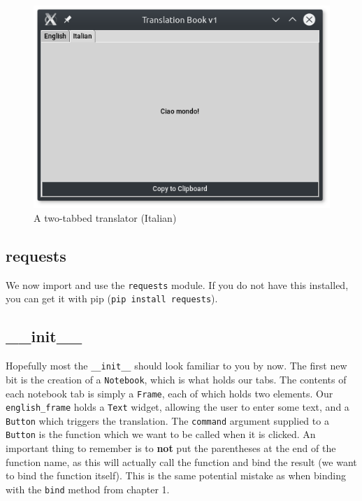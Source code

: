 \documentclass[a4paper,11pt,openany]{book}
\begin{document}
\newpage

\begin{figure}[h]
\centering
\includegraphics{Ch3-1-2}
\caption{A two-tabbed translator (Italian)}
\end{figure}



\subsection{requests}

We now import and use the \lstinline[columns=fixed]{requests} module. If you do not have this installed, you can get it with pip (\lstinline[columns=fixed]{pip install requests}).

\subsection{\_\_init\_\_}

Hopefully most the \lstinline[columns=fixed]{__init__} should look familiar to you by now. The first new bit is the creation of a \lstinline[columns=fixed]{Notebook}, which is what holds our tabs. The contents of each notebook tab is simply a \lstinline[columns=fixed]{Frame}, each of which holds two elements. Our \lstinline[columns=fixed]{english_frame} holds a \lstinline[columns=fixed]{Text} widget, allowing the user to enter some text, and a \lstinline[columns=fixed]{Button} which triggers the translation. The \lstinline[columns=fixed]{command} argument supplied to a \lstinline[columns=fixed]{Button} is the function which we want to be called when it is clicked. An important thing to remember is to \textbf{not} put the parentheses at the end of the function name, as this will actually call the function and bind the result (we want to bind the function itself). This is the same potential mistake as when binding with the \lstinline[columns=fixed]{bind} method from chapter 1.
\end{document}
